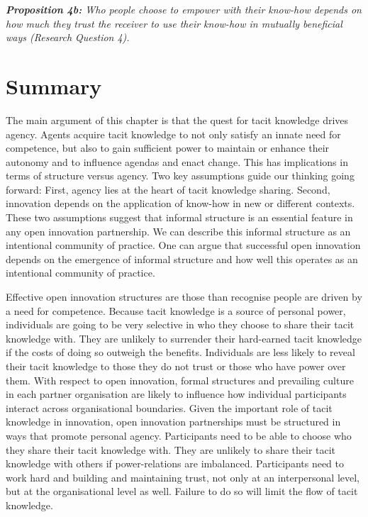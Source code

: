 \begin{tcolorbox}
\textit{\textbf{Proposition 4b:} Who people choose to empower with their know-how depends on how much they trust the receiver to use their know-how in mutually beneficial ways (Research Question 4).} 
\end{tcolorbox}

\section{Summary}

The main argument of this chapter is that the quest for tacit knowledge drives agency. Agents acquire tacit knowledge to not only satisfy an innate need for competence, but also to gain sufficient power to maintain or enhance their autonomy and to influence agendas and enact change. This has implications in terms of structure versus agency. Two key assumptions guide our thinking going forward: First, agency lies at the heart of tacit knowledge sharing. Second, innovation depends on the application of know-how in new or different contexts. These two assumptions suggest that informal structure is an essential feature in any open innovation partnership. We can describe this informal structure as an intentional community of practice. One can argue that successful open innovation depends on the emergence of informal structure and how well this operates as an intentional community of practice. \medskip

Effective open innovation structures are those than recognise people are driven by a need for competence. Because tacit knowledge is a source of personal power, individuals are going to be very selective in who they choose to share their tacit knowledge with. They are unlikely to surrender their hard-earned tacit knowledge if the costs of doing so outweigh the benefits. Individuals are less likely to reveal their tacit knowledge to those they do not trust or those who have power over them. With respect to open innovation, formal structures and prevailing culture in each partner organisation are likely to influence how individual participants interact across organisational boundaries. Given the important role of tacit knowledge in innovation, open innovation partnerships must be structured in ways that promote personal agency. Participants need to be able to choose who they share their tacit knowledge with. They are unlikely to share their tacit knowledge with others if power-relations are imbalanced. Participants need to work hard and building and maintaining trust, not only at an interpersonal level, but at the organisational level as well. Failure to do so will limit the flow of tacit knowledge. \medskip

